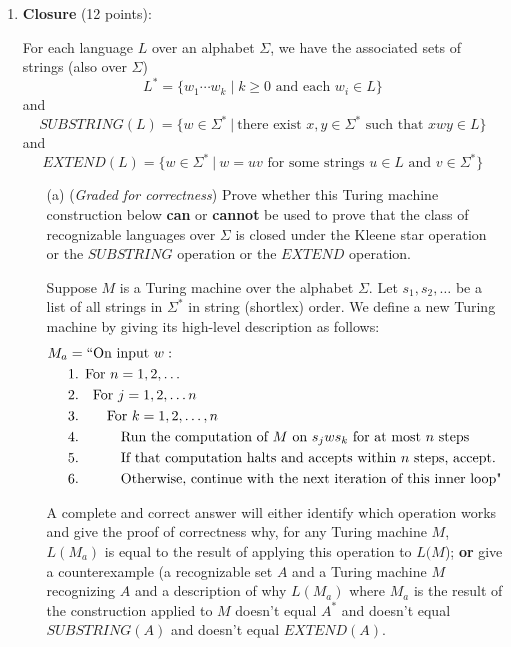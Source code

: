 \documentclass[12pt, oneside]{article}
\newcommand{\gradeCorrect}{({\it Graded for correctness}) }
\begin{document}
\begin{enumerate}[wide, labelwidth=!, labelindent=0pt]
\item\textbf{Closure} (12 points):

For each language $L$ over an alphabet $\Sigma$, we have the 
associated sets of strings (also over $\Sigma$)
\[
    L^* = \{ w_1 \cdots w_k \mid k \geq 0 \textrm{ and each } w_i \in L\}
\]
and
\[
    SUBSTRING(L) = \{ w \in \Sigma^* ~|~ \text{there exist } x,y \in \Sigma^* \text{ such that } xwy \in L\}
\]
and 
\[
    EXTEND(L) = \{ w \in \Sigma^* ~|~ w = uv \text{ for some strings } u \in L \text{ and } v \in \Sigma^* \}
\]

\begin{enumerate}
\item[(a)]\gradeCorrect Prove whether this Turing machine construction below 
{\bf can} or {\bf cannot} be used to prove that the
class of recognizable languages over $\Sigma$ is closed under the 
Kleene star operation or the $SUBSTRING$ operation or the $EXTEND$ operation.

Suppose $M$ is a Turing machine over the alphabet $\Sigma$. 
Let $s_1, s_2, \ldots$ be a list of all strings in 
$\Sigma^*$ in string (shortlex) order.
We define a new Turing machine
by giving its high-level description as follows: 
\begin{align*}
   M_{a} &= ``\text{On input }w:\\
    &\text{1. For $n = 1, 2, \ldots$}\\
    &\text{2.~~~For $j = 1, 2, \ldots n$} \\
    &\text{3.~~~~~~For $k = 1, 2, \ldots, n$} \\
    &\text{4.~~~~~~~~~Run the computation of $M$ on $s_jws_k$ for at most $n$ steps}\\
    &\text{5.~~~~~~~~~If that computation halts and accepts within $n$ steps, accept.}\\
    &\text{6.~~~~~~~~~Otherwise, continue with the next iteration of this inner loop"}\\
\end{align*}

A complete and correct answer will either identify which operation works and give the proof of correctness why, for any Turing machine $M$, $L(M_{a})$ is equal to the result of applying this operation to $L(M$); {\bf or} give a counterexample (a recognizable set $A$ and a Turing machine $M$ recognizing $A$
and a description of why $L(M_a)$ where $M_a$ is the result of the construction 
applied to $M$ doesn't equal $A^*$ and doesn't equal $SUBSTRING(A)$ and doesn't equal $EXTEND(A)$.


\end{enumerate}
\end{enumerate}
\end{document}

